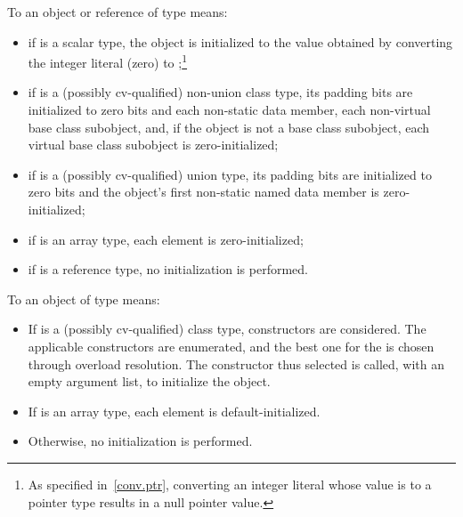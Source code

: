 \pnum
{}%
%
%
To
an object or reference of type
means:
\begin{itemize}
\item
if
is a scalar type, the
object
is initialized to the value obtained by converting the integer literal 
(zero) to
;\footnote{As specified in~\ref{conv.ptr}, converting an integer
literal whose value is
to a pointer type results in a null pointer value.
}

\item
if
is a (possibly cv-qualified) non-union class type,
its padding bits are initialized to zero bits and
each non-static data member,
each non-virtual base class subobject, and,
if the object is not a base class subobject,
each virtual base class subobject
is zero-initialized;

\item
if
is a (possibly cv-qualified) union type,
its padding bits are initialized to zero bits and
the
object's first non-static named
data member
is zero-initialized;

\item
if
is an array type,
each element is zero-initialized;
\item
if
is a reference type, no initialization is performed.
\end{itemize}

\pnum
To
an object of type
means:

\begin{itemize}
\item
If
is a (possibly cv-qualified) class type,
constructors are considered. The applicable constructors are
enumerated, and the best one for the
 \tcode{()} is chosen through
overload resolution. The constructor thus selected
is called, with an empty argument list, to initialize the object.

\item
If
is an array type, each element is default-initialized.

\item
Otherwise,
no initialization is performed.
\end{itemize}

